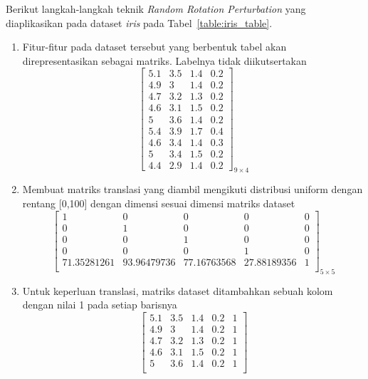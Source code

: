 Berikut langkah-langkah teknik \textit{Random Rotation Perturbation} yang diaplikasikan pada dataset \textit{iris} pada Tabel~\ref{table:iris_table}.
\begin{enumerate}
    \item Fitur-fitur pada dataset tersebut yang berbentuk tabel akan direpresentasikan sebagai matriks. Labelnya tidak diikutsertakan
    \[
        \begin{bmatrix}
        5.1		&		3.5		&		1.4		&		0.2	\\
        4.9		&		3		&		1.4		&		0.2	\\
        4.7		&		3.2		&		1.3		&		0.2	\\
        4.6		&		3.1		&		1.5		&		0.2	\\
        5		&		3.6		&		1.4		&		0.2	\\
        5.4		&		3.9		&		1.7		&		0.4	\\
        4.6		&		3.4		&		1.4		&		0.3	\\
        5		&		3.4		&		1.5		&		0.2	\\
        4.4		&		2.9		&		1.4		&		0.2 
        \end{bmatrix}_{9\times 4}
    \]
    \item Membuat matriks translasi yang diambil mengikuti distribusi uniform dengan rentang [0,100] dengan dimensi sesuai dimensi matriks dataset
    \[
        \begin{bmatrix}
            1				&		0				&		0				&		0			&		0 \\
            0				&		1				&		0				&		0			&		0 \\
            0				&		0				&		1				&		0			&		0 \\
            0				&		0				&		0				&		1 			&		0 \\
            71.35281261		&		93.96479736		&		77.16763568		&		27.88189356 &		1 \\
        \end{bmatrix}_{5\times 5}
    \]
    \item Untuk keperluan translasi, matriks dataset ditambahkan sebuah kolom dengan nilai 1 pada setiap barisnya
    \[
        \begin{bmatrix}
            5.1		&		3.5		&		1.4		&		0.2		&		1 \\
            4.9		&		3		&		1.4		&		0.2		&		1 \\
            4.7		&		3.2		&		1.3		&		0.2		&		1 \\
            4.6		&		3.1		&		1.5		&		0.2		&		1 \\
            5		&		3.6		&		1.4		&		0.2		&		1 \\

\end{bmatrix}\]
\end{enumerate}
